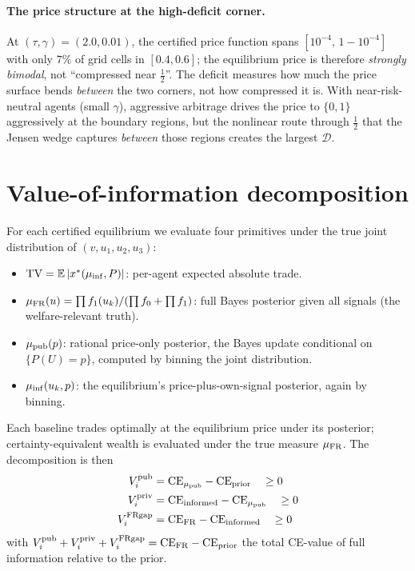 \documentclass[11pt]{article}
\newcommand{\E}{\mathbb{E}}
\newcommand{\1}{\mathbf{1}}
\newcommand{\deficit}{\mathcal{D}}
\newcommand{\Vipub}{V_{i}^{\rm pub}}
\newcommand{\Vipriv}{V_{i}^{\rm priv}}
\newcommand{\ViFR}{V_{i}^{\rm FRgap}}
\begin{document}
\paragraph{The price structure at the high-deficit corner.}
At $(\tau,\gamma)=(2.0,0.01)$, the certified price function spans
$[10^{-4},\,1-10^{-4}]$ with only $7\%$ of grid cells in $[0.4,0.6]$;
the equilibrium price is therefore \emph{strongly bimodal}, not
``compressed near $\tfrac12$''. The deficit measures how much the price
surface bends \emph{between} the two corners, not how compressed it is.
With near-risk-neutral agents (small $\gamma$), aggressive arbitrage
drives the price to $\{0,1\}$ aggressively at the boundary regions, but
the nonlinear route through $\tfrac12$ that the Jensen wedge captures
\emph{between} those regions creates the largest $\deficit$.

\section{Value-of-information decomposition}

For each certified equilibrium we evaluate four primitives under the
true joint distribution of $(v, u_1, u_2, u_3)$:
\begin{itemize}
\item $\mathrm{TV} = \E\,|x^*(\mu_{\rm inf}, P)|$: per-agent expected
absolute trade.
\item $\mu_{\rm FR}(u)=\prod f_1(u_k)/(\prod f_0 + \prod f_1)$: full
Bayes posterior given all signals (the welfare-relevant truth).
\item $\mu_{\rm pub}(p)$: rational price-only posterior, the Bayes update
conditional on $\{P(U)=p\}$, computed by binning the joint distribution.
\item $\mu_{\rm inf}(u_k,p)$: the equilibrium's price-plus-own-signal
posterior, again by binning.
\end{itemize}
Each baseline trades optimally at the equilibrium price under its
posterior; certainty-equivalent wealth is evaluated under the true
measure $\mu_{\rm FR}$. The decomposition is then
\begin{align*}
\Vipub &= \mathrm{CE}_{\mu_{\rm pub}} - \mathrm{CE}_{\rm prior}\quad\ge 0\\
\Vipriv &= \mathrm{CE}_{\rm informed} - \mathrm{CE}_{\mu_{\rm pub}}\quad\ge 0\\
\ViFR &= \mathrm{CE}_{\rm FR} - \mathrm{CE}_{\rm informed}\quad\ge 0
\end{align*}
with $\Vipub + \Vipriv + \ViFR = \mathrm{CE}_{\rm FR}-\mathrm{CE}_{\rm prior}$
the total CE-value of full information relative to the prior.
\end{document}
